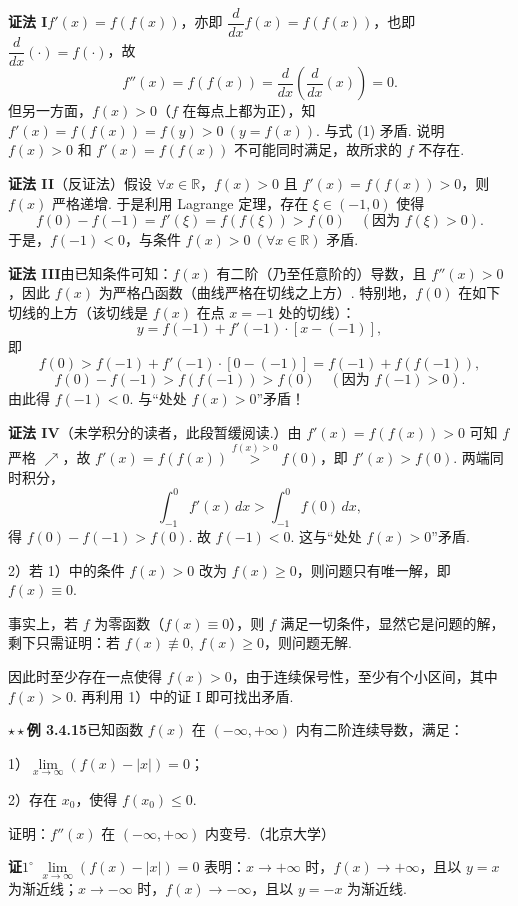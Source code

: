\documentclass[UTF8,12pt,a4paper,fontset=fandol]{ctexart}
\begin{document}
\noindent\textbf{证法 I}\quad $f'(x)=f(f(x))$，亦即 $\dfrac{d}{dx}f(x)=f(f(x))$，也即 $\dfrac{d}{dx}(\cdot)=f(\cdot)$，故
\[
  f''(x)=f(f(x))=\frac{d}{dx}\left(\frac{d}{dx}(x)\right)=0. \tag{1}
\]
但另一方面，$f(x)>0$（$f$ 在每点上都为正），知 $f'(x)=f(f(x))=f(y)>0\ (y=f(x))$. 与式 (1) 矛盾. 说明 $f(x)>0$ 和 $f'(x)=f(f(x))$ 不可能同时满足，故所求的 $f$ 不存在.

\noindent\textbf{证法 II}\quad （反证法）假设 $\forall x\in\mathbb R$，$f(x)>0$ 且 $f'(x)=f(f(x))>0$，则 $f(x)$ 严格递增. 于是利用 Lagrange 定理，存在 $\xi\in(-1,0)$ 使得
\[
  f(0)-f(-1)=f'(\xi)=f(f(\xi))>f(0)\quad(\text{因为 }f(\xi)>0).
\]
于是，$f(-1)<0$，与条件 $f(x)>0\ (\forall x\in\mathbb R)$ 矛盾.

\noindent\textbf{证法 III}\quad 由已知条件可知：$f(x)$ 有二阶（乃至任意阶的）导数，且 $f''(x)>0$，因此 $f(x)$ 为严格凸函数（曲线严格在切线之上方）. 特别地，$f(0)$ 在如下切线的上方（该切线是 $f(x)$ 在点 $x=-1$ 处的切线）：
\[
  y=f(-1)+f'(-1)\cdot[x-(-1)],
\]
即
\[
  f(0)>f(-1)+f'(-1)\cdot[0-(-1)]
  =f(-1)+f(f(-1)),
\]
\[
  f(0)-f(-1)>f(f(-1))>f(0)\quad(\text{因为 }f(-1)>0).
\]
由此得 $f(-1)<0$. 与“处处 $f(x)>0$”矛盾！

\noindent\textbf{证法 IV}\quad （未学积分的读者，此段暂缓阅读.）由 $f'(x)=f(f(x))>0$ 可知 $f$ 严格 $\nearrow$，故 $f'(x)=f(f(x))\overset{f(x)>0}{>}f(0)$，即 $f'(x)>f(0)$. 两端同时积分，
\[
  \int_{-1}^0 f'(x)\,dx>\int_{-1}^0 f(0)\,dx,
\]
得 $f(0)-f(-1)>f(0)$. 故 $f(-1)<0$. 这与“处处 $f(x)>0$”矛盾.

2）若 1）中的条件 $f(x)>0$ 改为 $f(x)\ge0$，则问题只有唯一解，即 $f(x)\equiv0$.

事实上，若 $f$ 为零函数（$f(x)\equiv0$），则 $f$ 满足一切条件，显然它是问题的解，剩下只需证明：若 $f(x)\not\equiv0,\ f(x)\ge0$，则问题无解.

因此时至少存在一点使得 $f(x)>0$，由于连续保号性，至少有个小区间，其中 $f(x)>0$. 再利用 1）中的证 I 即可找出矛盾.

\noindent\textbf{$\star\star$例 3.4.15}\quad 已知函数 $f(x)$ 在 $(-\infty,+\infty)$ 内有二阶连续导数，满足：

1）$\lim\limits_{x\to\infty}(f(x)-|x|)=0$；

2）存在 $x_0$，使得 $f(x_0)\le0$.

证明：$f''(x)$ 在 $(-\infty,+\infty)$ 内变号.（北京大学）

\noindent\textbf{证}\quad $1^\circ$ $\lim\limits_{x\to\infty}(f(x)-|x|)=0$ 表明：$x\to+\infty$ 时，$f(x)\to+\infty$，且以 $y=x$ 为渐近线；$x\to-\infty$ 时，$f(x)\to-\infty$，且以 $y=-x$ 为渐近线.
\end{document}
